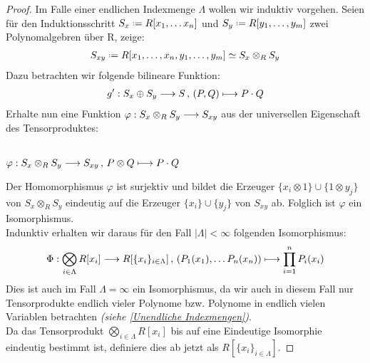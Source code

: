 \documentclass[10pt,a4paper]{report}
\newcommand{\functionfront}[3]{\nolinebreak{#1:#2 \longrightarrow #3}}
\newcommand{\function}[5]{\nolinebreak{#1:#2 \longrightarrow #3 \, , \, #4 \longmapsto #5}}
\newcommand{\Tensor}[3]{#1 \otimes_{#2} #3}
\newcommand{\tensor}[3]{#1 \otimes #3}
\newcommand*{\defeq}{\mathrel{\vcenter{\baselineskip0.5ex \lineskiplimit0pt
                     \hbox{\scriptsize.}\hbox{\scriptsize.}}}%
                     =}
\begin{document}
\begin{proof}
Im Falle einer endlichen Indexmenge $\Lambda$ wollen wir induktiv vorgehen. Seien für den Induktionsschritt $S_x \defeq R[x_1, \dots x_n]$ und $S_y \defeq R[y_1, \dots , y_m]$ zwei Polynomalgebren über R, zeige:
\begin{gather*}
S_{xy} \defeq R[x_1, \dots , x_n, y_1 , \dots , y_m] \simeq \Tensor{S_x}{R}{S_y}
\end{gather*}
Dazu betrachten wir folgende bilineare Funktion:
\begin{gather*}
\function{g'}{S_x \oplus S_y}{S}{(P,Q)}{P \cdot Q}
\end{gather*}
Erhalte nun eine Funktion $\functionfront{\varphi}{\Tensor{S_x}{R}{S_y}}{S_{xy}}$ aus der universellen Eigenschaft des Tensorproduktes:
\begin{center}
\ \\
$\function{\varphi}{\Tensor{S_x}{R}{S_y}}{S_{xy}}{\tensor{P}{R}{Q}}{P \cdot Q}$
\end{center}
Der Homomorphismus $\varphi$ ist surjektiv und bildet die Erzeuger $\lbrace \tensor{x_i}{R}{1} \rbrace \cup \lbrace \tensor{1}{R}{y_j} \rbrace$ von $\Tensor{S_x}{R}{S_y}$ eindeutig auf die Erzeuger $\lbrace x_i \rbrace \cup \lbrace y_j \rbrace$ von $S_{xy}$ ab. Folglich ist $\varphi$ ein Isomorphismus.\\
Indunktiv erhalten wir daraus für den Fall $\vert \Lambda \vert < \infty$ folgenden Isomorphismus:
\begin{gather*}
\function{\Phi}{\bigotimes_{i \in \Lambda} R[x_i]}{R[\lbrace x_i \rbrace_{i \in \Lambda} ]}{(P_1(x_1), \dots P_n(x_n))}{\prod_{i=1}^{n} P_i(x_i)}
\end{gather*}
Dies ist auch im Fall $\Lambda = \infty$ ein Isomorphismus, da wir auch in diesem Fall nur Tensorprodukte endlich vieler Polynome bzw. Polynome in endlich vielen Variablen betrachten \textit{(siehe \cref{Unendliche Indexmengen})}.\\
Da das Tensorprodukt $\bigotimes_{i \in \Lambda} R[x_i]$ bis auf eine Eindeutige Isomorphie eindeutig bestimmt ist, definiere dies ab jetzt als $R[\lbrace x_i \rbrace_{i \in \Lambda}]$.
\end{proof}
\end{document}
